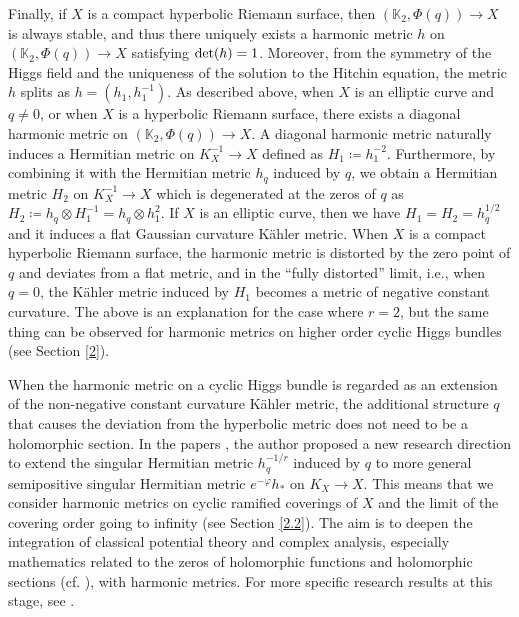 \documentclass[12pt]{article}
\theoremstyle{definition}
\def\det{{\rm det}}
\def\det{{\rm det}}
\def\refe{\ast}
\def\K{{\mathbb K}}
\begin{document}
Finally, if $X$ is a compact hyperbolic Riemann surface, then $(\K_2,\Phi(q))\rightarrow X$ is always stable, and thus there uniquely exists a harmonic metric $h$ on $(\K_2, \Phi(q))\rightarrow X$ satisfying $\det(h)=1$. Moreover, from the symmetry of the Higgs field and the uniqueness of the solution to the Hitchin equation, the metric $h$ splits as $h=(h_1,h_1^{-1})$. As described above, when $X$ is an elliptic curve and $q\neq0$, or when $X$ is a hyperbolic Riemann surface, there exists a diagonal harmonic metric on $(\K_2,\Phi(q))\rightarrow X$. A diagonal harmonic metric naturally induces a Hermitian metric on $K_X^{-1}\rightarrow X$ defined as $H_1\coloneqq h_1^{-2}$. Furthermore, by combining it with the Hermitian metric $h_q$ induced by $q$, we obtain a Hermitian metric $H_2$ on $K_X^{-1}\rightarrow X$ which is degenerated at the zeros of $q$ as $H_2\coloneqq h_q\otimes H_1^{-1}=h_q\otimes h_1^2$. If $X$ is an elliptic curve, then we have $H_1=H_2=h_q^{1/2}$ and it induces a flat Gaussian curvature K\"ahler metric. When $X$ is a compact hyperbolic Riemann surface, the harmonic metric is distorted by the zero point of $q$ and deviates from a flat metric, and in the ``fully distorted'' limit, i.e., when $q=0$, the K\"ahler metric induced by $H_1$ becomes a metric of negative constant curvature. The above is an explanation for the case where $r=2$, but the same thing can be observed for harmonic metrics on higher order cyclic Higgs bundles (see Section \ref{2}).

When the harmonic metric on a cyclic Higgs bundle is regarded as an extension of the non-negative constant curvature K\"ahler metric, the additional structure $q$ that causes the deviation from the hyperbolic metric does not need to be a holomorphic section. In the papers \cite{Miy3, Miy4, Miy5}, the author proposed a new research direction to extend the singular Hermitian metric $h_q^{-1/r}$ induced by $q$ to more general semipositive singular Hermitian metric $e^{-\varphi}h_\refe$ on $K_X\rightarrow X$. This means that we consider harmonic metrics on cyclic ramified coverings of $X$ and the limit of the covering order going to infinity (see Section \ref{2.2}). The aim is to deepen the integration of classical potential theory and complex analysis, especially mathematics related to the zeros of holomorphic functions and holomorphic sections (cf. \cite{BCHM1, Ran1, ST1, SZ1}), with harmonic metrics. For more specific research results at this stage, see \cite{Miy4, Miy5}.
\end{document}
